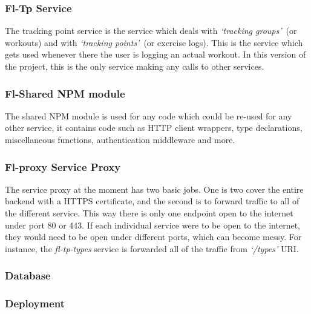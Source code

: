 \documentclass{article}
\newcommand{\vspaceconst}{-2ex}
\newcommand{\tps}{\textit{`tracking points'}}
\newcommand{\tgs}{\textit{`tracking groups'}}
\begin{document}
\begin{multicols}{2}
\subsubsection{Fl-Tp Service}
\vspace{\vspaceconst}

The tracking point service is the service which deals with \tgs~(or workouts) and with \tps~(or exercise logs). This is the service which gets used whenever there the user is logging an actual workout. In this version of the project, this is the only service making any calls to other services.\\

\subsubsection{Fl-Shared NPM module}
\vspace{\vspaceconst}

The shared NPM module is used for any code which could be re-used for any other service, it contains code such as HTTP client wrappers, type declarations, miscellaneous functions, authentication middleware and more.\\

\subsubsection{Fl-proxy Service Proxy}
\vspace{\vspaceconst}

The service proxy at the moment has two basic jobs. One is two cover the entire backend with a HTTPS certificate, and the second is to forward traffic to all of the different service. This way there is only one endpoint open to the internet under port 80 or 443. If each individual service were to be open to the internet, they would need to be open under different ports, which can become messy. For instance, the \textit{fl-tp-types} service is forwarded all of the traffic from \textit{`/types'} URI.\\

\subsubsection{Database}
\vspace{\vspaceconst}

\subsubsection{Deployment}
\vspace{\vspaceconst}


\end{multicols}
\end{document}
